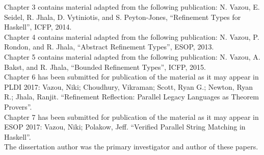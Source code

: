 Chapter 3 contains material adapted from the following publication:
\noindent N. Vazou, E. Seidel, R. Jhala, D. Vytiniotis, and S. Peyton-Jones,
``Refinement Types for Haskell'', 
ICFP, 2014.\\

Chapter 4 contains material adapted from the following publication:
\noindent N. Vazou, P. Rondon, and R. Jhala,
``Abstract Refinement Types'', 
ESOP, 2013.\\

Chapter 5 contains material adapted from the following publication:
\noindent N. Vazou, A. Bakst, and R. Jhala,
``Bounded Refinement Types'',
ICFP, 2015.\\


Chapter 6 has been submitted for publication of the material as it may appear in PLDI 2017:
\noindent Vazou, Niki; Choudhury, Vikraman; Scott, Ryan G.; Newton, Ryan R.; Jhala, Ranjit.
``Refinement Reflection: Parallel Legacy Languages as Theorem Provers''.\\

Chapter 7 has been submitted for publication of the material as it may appear in ESOP 2017:
\noindent Vazou, Niki; Polakow, Jeff.
``Verified Parallel String Matching in Haskell''.\\

The dissertation author was the primary investigator and author of these papers.